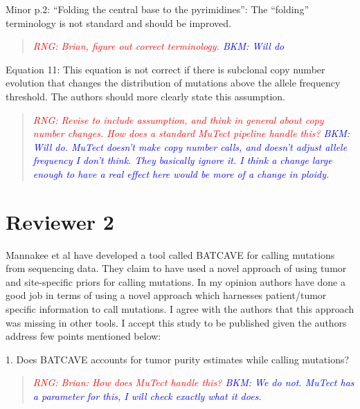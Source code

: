 \documentclass[11pt]{article}
\newcommand{\BKM}[1]{\textcolor{blue}{BKM: #1}}
\newcommand{\RNG}[1]{\textcolor{red}{RNG: #1}}
\newenvironment{response}
{\begin{quote}\itshape}
{\end{quote}}
\begin{document}
Minor
p.2: “Folding the central base to the pyrimidines”: The “folding” terminology is not standard and should be improved. 
\begin{response}
\RNG{Brian, figure out correct terminology.}
\BKM{Will do}
\end{response}

Equation 11: This equation is not correct if there is subclonal copy number evolution that changes the distribution of mutations above the allele frequency threshold. The authors should more clearly state this assumption.
\begin{response}
\RNG{Revise to include assumption, and think in general about copy number changes. How does a standard MuTect pipeline handle this?}
\BKM{Will do. MuTect doesn't make copy number calls, and doesn't adjust allele frequency I don't think. They basically ignore it. I think a change large enough to have a real effect here would be more of a change in ploidy.}
\end{response}

\section*{Reviewer 2}

Mannakee et al have developed a tool called BATCAVE for calling mutations from sequencing data. They claim to have used a novel approach of using tumor and site-specific priors for calling mutations. In my opinion authors have done a good job in terms of using a novel approach which harnesses patient/tumor specific information to call mutations. I agree with the authors that this approach was missing in other tools. I accept this study to be published given the authors address few points mentioned below:

1. Does BATCAVE accounts for tumor purity estimates while calling mutations?
\begin{response}
\RNG{Brian: How does MuTect handle this?}
\BKM{We do not. MuTect has a parameter for this, I will check exactly what it does.}
\end{response}
\end{document}
